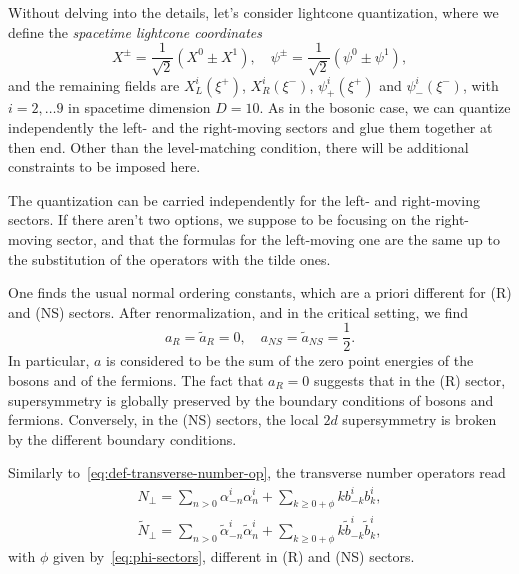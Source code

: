 Without delving into the details, let's consider lightcone quantization, where we define the \emph{spacetime lightcone coordinates}
\begin{equation}
    X^\pm = \frac{1}{\sqrt{2}} (X^0 \pm X^1), \quad \psi^\pm = \frac{1}{\sqrt{2}} (\psi^0 \pm \psi^1),
\end{equation}
and the remaining fields are $X^i_L(\xi^+)$, $X^i_R(\xi^-)$, $\psi^i_+(\xi^+)$ and $\psi^i_-(\xi^-)$, with $i = 2, \dots 9$ in spacetime dimension $D = 10$. As in the bosonic case, we can quantize independently the left- and the right-moving sectors and glue them together at then end. Other than the level-matching condition, there will be additional constraints to be imposed here.

The quantization can be carried independently for the left- and right-moving sectors. If there aren't two options, we suppose to be focusing on the right-moving sector, and that the formulas for the left-moving one are the same up to the substitution of the operators with the tilde ones.

One finds the usual normal ordering constants, which are a priori different for (R) and (NS) sectors. After renormalization, and in the critical setting, we find
\begin{equation}
    a_R = \tilde{a}_R = 0, \quad a_{NS} = \tilde{a}_{NS} = \frac{1}{2} .
\end{equation}
In particular, $a$ is considered to be the sum of the zero point energies of the bosons and of the fermions. The fact that $a_R = 0$ suggests that in the (R) sector, supersymmetry is globally preserved by the boundary conditions of bosons and fermions. Conversely, in the (NS) sectors, the local $2d$ supersymmetry is broken by the different boundary conditions.

Similarly to~\eqref{eq:def-transverse-number-op}, the transverse number operators read
\begin{equation}\label{eq:superstring-transverse-number-op}
\begin{aligned}
    N_\perp = \sum_{n > 0} \alpha_{-n}^i \alpha^i_n + \sum_{k \geq 0 + \phi} k b^i_{-k} b^i_k , \\
    \tilde{N}_\perp = \sum_{n > 0} \tilde{\alpha}_{-n}^i \tilde{\alpha}^i_n + \sum_{k \geq 0 + \phi} k \tilde{b}^i_{-k} \tilde{b}^i_k ,
\end{aligned}
\end{equation}
with $\phi$ given by~\eqref{eq:phi-sectors}, different in (R) and (NS) sectors.



